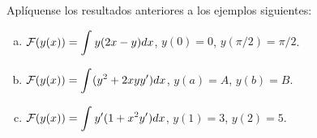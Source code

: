 \begin{ejercicio}
Aplíquense los resultados anteriores a los ejemplos siguientes:
\begin{enumerate}[a)]
\item $\mathcal{F}(y(x))=\displaystyle\int_{  }^{  } y(2x-y)dx$, $y(0)=0$, $y(\pi/2)=\pi/2$.
\item $\mathcal{F}(y(x))=\displaystyle\int_{  }^{  } (y^2+2xyy')dx$, $y(a)=A$, $y(b)=B$.
\item $\mathcal{F}(y(x))=\displaystyle\int_{  }^{  } y'(1+x^2y')dx$, $y(1)=3$, $y(2)=5$.

\end{enumerate}
\end{ejercicio}

